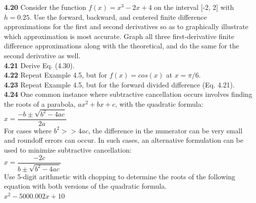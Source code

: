 \documentclass[../main.tex]{subfiles}
\begin{document}
\begin{multicols}{2}
    \noindent\textbf{4.20} Consider the function $f(x) = x^3 - 2x + 4$ on the interval
    [-2, 2] with $h = 0.25$. Use the forward, backward, and
    centered finite difference approximations for the first and
    second derivatives so as to graphically illustrate which approximation
    is most accurate. Graph all three first-derivative
    finite difference approximations along with the theoretical,
    and do the same for the second derivative as well.\\

    \noindent\textbf{4.21} Derive Eq. (4.30).\\

    \noindent\textbf{4.22} Repeat Example 4.5, but for $f (x) = cos(x)$ at $x = \pi/6$.\\

    \noindent\textbf{4.23} Repeat Example 4.5, but for the forward divided difference (Eq. 4.21).\\

    \noindent\textbf{4.24} One common instance where subtractive cancellation
    occurs involves finding the roots of a parabola, $ax^2+bx+c$, with the quadratic formula:\\

    $x = \dfrac{-b \pm \sqrt{b^2-4ac}}{2a}$\\

    \noindent For cases where $b^2 >> 4ac$, the difference in the numerator
    can be very small and roundoff errors can occur. In such
    cases, an alternative formulation can be used to minimize
    subtractive cancellation:\\

    $x = \dfrac{-2c}{b\pm \sqrt{b^2-4ac}}$\\

    \noindent Use 5-digit arithmetic with chopping to determine the roots
    of the following equation with both versions of the quadratic
    formula.\\

    $x^2 - 5000.002x+10$\\
\end{multicols}
\end{document}
